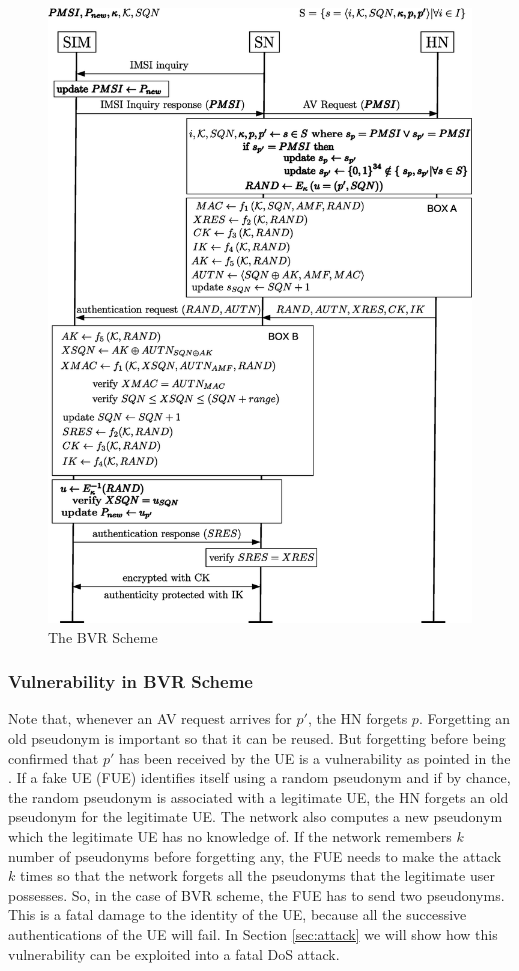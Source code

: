 \documentclass{llncs} %
\begin{document}
\begin{figure}[]
  \centering
    \includegraphics[width=\textwidth]{BVR.eps}
  \caption{The BVR Scheme}
  \label{fig:bvr_solution}	
\end{figure}


\subsubsection{Vulnerability in BVR Scheme}
Note that, whenever an AV request arrives for $p'$, the HN forgets $p$. Forgetting an old pseudonym is important so that it can be reused. But forgetting before being confirmed that $p'$ has been received by the UE is a vulnerability as pointed in the \cite{wisec17}. If a fake UE (FUE) identifies itself using a random pseudonym and if by chance, the random pseudonym is associated with a legitimate UE, the HN forgets an old pseudonym for the legitimate UE. The network also computes a new pseudonym which the legitimate UE has no knowledge of. If the network remembers  $k$ number of pseudonyms before forgetting any, the FUE needs to make the attack $k$ times so that the network forgets all the pseudonyms that the legitimate user possesses. So, in the case of BVR scheme, the FUE has to send two pseudonyms. This is a fatal damage to the identity of the UE, because all the successive authentications of the UE will fail. In Section \ref{sec:attack} we will show how this vulnerability can be exploited into a fatal DoS attack.
\end{document}
